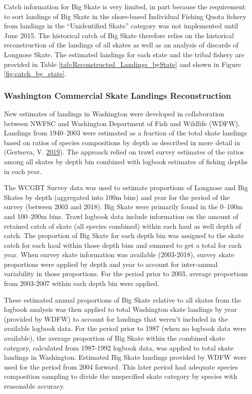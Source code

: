 \documentclass[12pt,]{article}
\begin{document}
Catch information for Big Skate is very limited, in part because the
requirement to sort landings of Big Skate in the shore-based Individual
Fishing Quota fishery from landings in the ``Unidentified Skate''
category was not implemented until June 2015. The historical catch of
Big Skate therefore relies on the historical reconstruction of the
landings of all skates as well as an analysis of discards of Longnose
Skate. The estimated landings for each state and the tribal fishery are
provided in Table \ref{tab:Reconstructed_Landings_byState} and shown in
Figure \ref{fig:catch_by_state}.

\hypertarget{washington-commercial-skate-landings-reconstruction}{%
\subsubsection{Washington Commercial Skate Landings
Reconstruction}\label{washington-commercial-skate-landings-reconstruction}}

New estimates of landings in Washington were developed in collaboration
between NWFSC and Washington Department of Fish and Wildlife (WDFW).
Landings from 1940--2003 were estimated as a fraction of the total skate
landings based on ratios of species compositions by depth as described
in more detail in (Gertseva, V.
\protect\hyperlink{ref-Gertseva2019}{2019}). The approach relied on
trawl survey estimates of the ratios among all skates by depth bin
combined with logbook estimates of fishing depths in each year.

The WCGBT Survey data was used to estimate proportions of Longnose and
Big Skates by depth (aggregated into 100m bins) and year for the period
of the survey (between 2003 and 2018). Big Skate were primarily found in
the 0--100m and 100--200m bins. Trawl logbook data include information
on the amount of retained catch of skate (all species combined) within
each haul as well depth of catch. The proportion of Big Skate for each
depth bin was assigned to the skate catch for each haul within those
depth bins and summed to get a total for each year. When survey skate
information was available (2003-2018), survey skate proportions were
applied by depth and year to account for inter-annual variability in
those proportions. For the period prior to 2003, average proportions
from 2003-2007 within each depth bin were applied.

These estimated annual proportions of Big Skate relative to all skates
from the logbook analysis was then applied to total Washington skate
landings by year (provided by WDFW) to account for landings that weren't
included in the available logbook data. For the period prior to 1987
(when no logbook data were available), the average proportion of Big
Skate within the combined skate category, calculated from 1987-1992
logbook data, was applied to total skate landings in Washington.
Estimated Big Skate landings provided by WDFW were used for the period
from 2004 forward. This later period had adequate species composition
sampling to divide the unspecified skate category by species with
reasonable accuracy.
\end{document}
